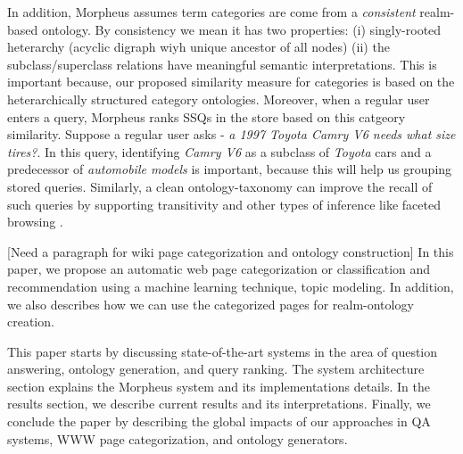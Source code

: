 In addition, Morpheus assumes term categories are come from a
\textit{consistent} realm-based ontology. By consistency we mean it has two
properties: (i) singly-rooted heterarchy (acyclic digraph wiyh unique 
ancestor of all nodes) (ii) the subclass/superclass relations have meaningful 
semantic interpretations. This is important because, our proposed similarity 
measure for categories is based on the heterarchically
structured category ontologies. Moreover, when a regular user enters a query,
Morpheus ranks SSQs in the store based on this catgeory similarity. Suppose a
regular user asks -\textit{ a 1997 Toyota Camry V6 needs what size tires?}. In
this query, identifying \textit{Camry V6} as a subclass of \textit{Toyota} cars
and a predecessor of \textit{automobile models} is important, because this will
help us grouping stored queries. Similarly, a clean ontology-taxonomy can
improve the recall of such queries by supporting transitivity and other types of
inference like faceted browsing \cite{Wu2008}.   

[Need a paragraph for wiki page categorization and ontology construction]
In this paper, we propose an automatic web page categorization or 
classification and recommendation using a machine learning technique, topic modeling.
In addition, we also describes how we can use the categorized pages for realm-ontology 
creation.   

This paper starts by discussing state-of-the-art systems in the area of
question answering, ontology generation, and query ranking. The system
architecture section explains the Morpheus system and its implementations
details. In the results section, we describe current results and its
interpretations. Finally, we conclude the paper by describing the global impacts
of our approaches in QA systems, WWW page categorization, and ontology
generators.
